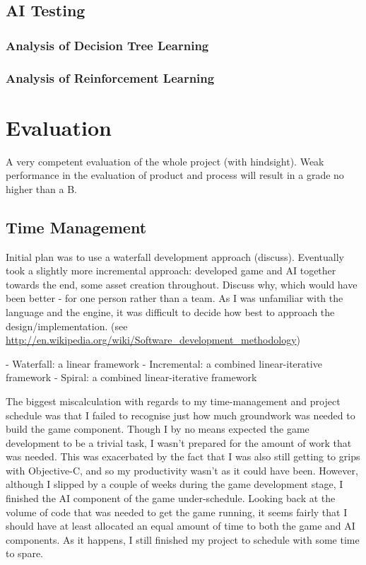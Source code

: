 \documentclass[a4paper,oneside]{report}
\begin{document}
\section{AI Testing}

\subsection{Analysis of Decision Tree Learning}
\subsection{Analysis of Reinforcement Learning}

%
%
\chapter{Evaluation}

A very competent evaluation of the whole project (with hindsight). Weak performance in the evaluation of product and process will result in a grade no higher than a B.

\section{Time Management}

Initial plan was to use a waterfall development approach (discuss). Eventually took a slightly more incremental approach: developed game and AI together towards the end, some asset creation throughout. Discuss why, which would have been better - for one person rather than a team. As I was unfamiliar with the language and the engine, it was difficult to decide how best to approach the design/implementation. (see \url{http://en.wikipedia.org/wiki/Software_development_methodology})
		
- Waterfall: a linear framework
- Incremental: a combined linear-iterative framework
- Spiral: a combined linear-iterative framework
		
The biggest miscalculation with regards to my time-management and project schedule was that I failed to recognise just how much groundwork was needed to build the game component. Though I by no means expected the game development to be a trivial task, I wasn't prepared for the amount of work that was needed. This was exacerbated by the fact that I was also still getting to grips with Objective-C, and so my productivity wasn't as it could have been. However, although I slipped by a couple of weeks during the game development stage, I finished the AI component of the game under-schedule. Looking back at the volume of code that was needed to get the game running, it seems fairly that I should have at least allocated an equal amount of time to both the game and AI components. As it happens, I still finished my project to schedule with some time to spare.
\end{document}
